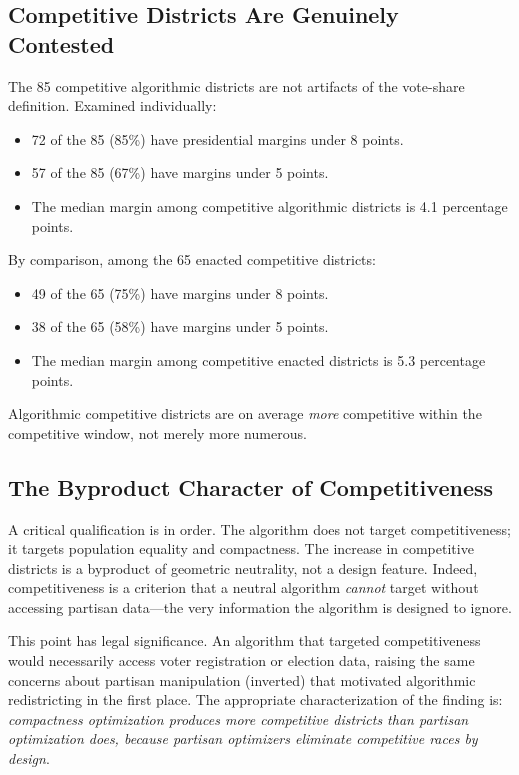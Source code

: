 \subsection{Competitive Districts Are Genuinely Contested}

The 85 competitive algorithmic districts are not artifacts of the vote-share
definition.  Examined individually:
\begin{itemize}
  \item 72 of the 85 (85\%) have presidential margins under 8 points.
  \item 57 of the 85 (67\%) have margins under 5 points.
  \item The median margin among competitive algorithmic districts is 4.1
    percentage points.
\end{itemize}

By comparison, among the 65 enacted competitive districts:
\begin{itemize}
  \item 49 of the 65 (75\%) have margins under 8 points.
  \item 38 of the 65 (58\%) have margins under 5 points.
  \item The median margin among competitive enacted districts is 5.3
    percentage points.
\end{itemize}

Algorithmic competitive districts are on average \emph{more} competitive
within the competitive window, not merely more numerous.

\subsection{The Byproduct Character of Competitiveness}

A critical qualification is in order.  The algorithm does not target
competitiveness; it targets population equality and compactness.  The
increase in competitive districts is a byproduct of geometric neutrality,
not a design feature.  Indeed, competitiveness is a criterion that a neutral
algorithm \emph{cannot} target without accessing partisan data---the very
information the algorithm is designed to ignore.

This point has legal significance.  An algorithm that targeted competitiveness
would necessarily access voter registration or election data, raising the same
concerns about partisan manipulation (inverted) that motivated algorithmic
redistricting in the first place.  The appropriate characterization of the
finding is: \emph{compactness optimization produces more competitive districts
than partisan optimization does, because partisan optimizers eliminate
competitive races by design}.

